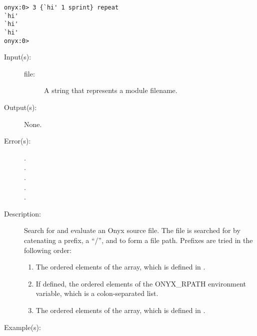 \begin{description}
\begin{description}
\begin{verbatim}
onyx:0> 3 {`hi' 1 sprint} repeat
`hi'
`hi'
`hi'
onyx:0>
		\end{verbatim}
	\end{description}
\label{systemdict:require}
\item[{\onyxop{file}{require}{--}}: ]
	\begin{description}\item[]
	\item[Input(s): ]
		\begin{description}\item[]
		\item[file: ]
			A string that represents a module filename.
		\end{description}
	\item[Output(s): ] None.
	\item[Error(s): ]
		\begin{description}\item[]
		\item[.]
		\item[.]
		\item[.]
		\item[.]
		\item[.]
		\end{description}
	\item[Description: ]
		Search for and evaluate an Onyx source file.  The file is
		searched for by catenating a prefix, a ``/'', and 
		to form a file path.  Prefixes are tried in the following order:
		\begin{enumerate}
			\item{The ordered elements of the
			 array, which is
			defined in .}
			\item{If defined, the ordered elements of the
			ONYX\_RPATH environment variable, which is a
			colon-separated list.}
			\item{The ordered elements of the
			 array, which
			is defined in .}
		\end{enumerate}
	\item[Example(s): ]\begin{verbatim}


\end{verbatim}
\end{description}
\end{description}
